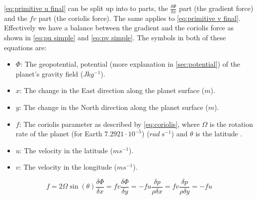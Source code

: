 \autoref{eq:primitive u final} can be split up into to parts, the $\frac{\delta \Phi}{\delta x}$ part (the gradient force) and the $fv$ part (the coriolis force). The same applies to 
\autoref{eq:primitive v final}. Effectively we have a balance between the gradient and the coriolis force as shown in \autoref{eq:pu simple} and \autoref{eq:pv simple}. The symbols in both of 
these equations are:

\begin{itemize}
    \item $\Phi$: The geopotential, potential (more explanation in \autoref{sec:potential}) of the planet's gravity field ($Jkg^{-1}$).
    \item $x$: The change in the East direction along the planet surface ($m$).
    \item $y$: The change in the North direction along the planet surface ($m$).
    \item $f$: The coriolis parameter as described by \autoref{eq:coriolis}, where $\Omega$ is the rotation rate of the planet (for Earth $7.2921 \cdot 10^{-5}$) ($rad \ s^{-1}$) and $\theta$ is the 
    latitude \cite{coriolis}.
    \item $u$: The velocity in the latitude ($ms^{-1}$).
    \item $v$: The velocity in the longitude ($ms^{-1}$).
\end{itemize}

\begin{subequations}
    \begin{equation}
        f = 2\Omega\sin(\theta)
        \label{eq:coriolis}
    \end{equation}
    \begin{equation}
        \frac{\delta \Phi}{\delta x} = fv
        \label{eq:pu simple}
    \end{equation}
    \begin{equation}
        \frac{\delta \Phi}{\delta y} = -fu
        \label{eq:pv simple}
    \end{equation}
    \begin{equation}
        \frac{\delta p}{\rho \delta x} = fv
        \label{eq:pu simple final}
    \end{equation}
    \begin{equation}
        \frac{\delta p}{\rho \delta y} = -fu
        \label{eq:pv simple final}
    \end{equation}
\end{subequations}

